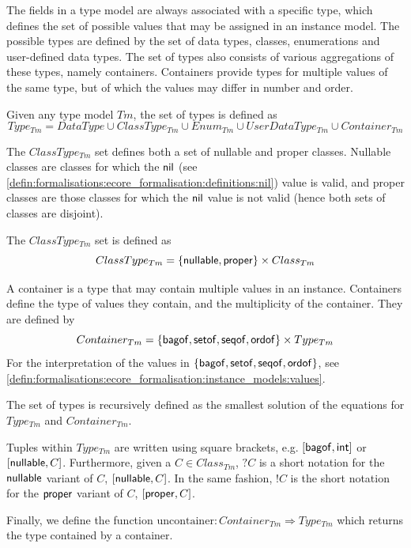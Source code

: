 The fields in a type model are always associated with a specific type, which defines the set of possible values that may be assigned in an instance model. The possible types are defined by the set of data types, classes, enumerations and user-defined data types. The set of types also consists of various aggregations of these types, namely containers. Containers provide types for multiple values of the same type, but of which the values may differ in number and order.

\begin{defin}[Types]
\label{defin:formalisations:ecore_formalisation:type_models:types}
Given any type model $Tm$, the set of types is defined as
\begin{equation*}
Type_{Tm} = DataType \cup ClassType_{Tm} \cup Enum_{Tm} \cup UserDataType_{Tm} \cup Container_{Tm}
\end{equation*}

The $ClassType_{Tm}$ set defines both a set of nullable and proper classes. Nullable classes are classes for which the $\mathsf{nil}$ (see \cref{defin:formalisations:ecore_formalisation:definitions:nil}) value is valid, and proper classes are those classes for which the $\mathsf{nil}$ value is not valid (hence both sets of classes are disjoint). 

The $ClassType_{Tm}$ set is defined as
\begin{equation*}
ClassType_{Tm} = \{ \mathsf{nullable}, \mathsf{proper} \} \times Class_{Tm}
\end{equation*}

A container is a type that may contain multiple values in an instance. Containers define the type of values they contain, and the multiplicity of the container. They are defined by 
\begin{equation*}
Container_{Tm} = \{ \mathsf{bagof}, \mathsf{setof}, \mathsf{seqof}, \mathsf{ordof} \} \times Type_{Tm}
\end{equation*}
For the interpretation of the values in $\{ \mathsf{bagof}, \mathsf{setof}, \mathsf{seqof}, \mathsf{ordof} \}$, see \cref{defin:formalisations:ecore_formalisation:instance_models:values}.

The set of types is recursively defined as the smallest solution of the equations for $Type_{Tm}$ and $Container_{Tm}$.

Tuples within $Type_{Tm}$ are written using square brackets, e.g. $[\mathsf{bagof}, \mathsf{int} ]$ or $[ \mathsf{nullable}, C ]$. Furthermore, given a $C \in Class_{Tm}$, $?C$ is a short notation for the $\mathsf{nullable}$ variant of $C$, $[ \mathsf{nullable}, C ]$. In the same fashion, $!C$ is the short notation for the $\mathsf{proper}$ variant of $C$, $[ \mathsf{proper}, C ]$.

Finally, we define the function $\mathrm{uncontainer}\!: Container_{Tm} \Rightarrow Type_{Tm}$ which returns the type contained by a container.

\end{defin}

